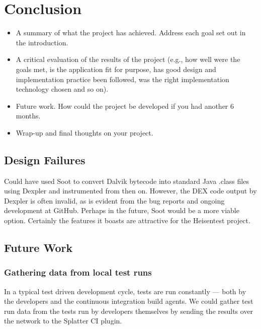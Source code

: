 \section{Conclusion}
\label{sec:conc}

\begin{mdframed}
	\begin{itemize}
		\item A summary of what the project has achieved. Address each goal set out in the introduction.
		\item A critical evaluation of the results of the project (e.g., how well were the goals met, is the application fit for purpose, has good design and implementation practice been followed, was the right implementation technology chosen and so on).
		\item Future work. How could the project be developed if you had another 6 months.
		\item Wrap-up and final thoughts on your project.
	\end{itemize}
\end{mdframed}


\subsection{Design Failures}

Could have used Soot to convert Dalvik bytecode into standard Java .class files using Dexpler \cite{bartel:soap2012} and instrumented from then on. However, the DEX code output by Dexpler is often invalid, as is evident from the bug reports and ongoing development at GitHub. Perhaps in the future, Soot would be a more viable option. Certainly the features it boasts are attractive for the Heisentest project.


\subsection{Future Work}

\subsubsection{Gathering data from local test runs}

In a typical test driven development cycle, tests are run constantly --- both by the developers and the continuous integration build agents. We could gather test run data from the tests run by developers themselves by sending the results over the network to the Splatter CI plugin.

